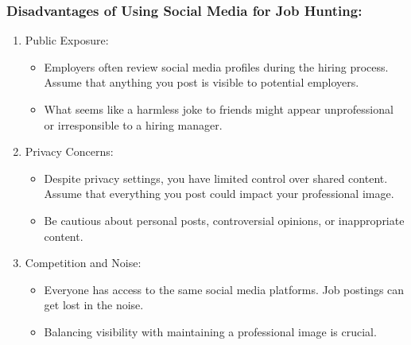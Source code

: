 \subsubsection*{Disadvantages of Using Social Media for Job Hunting:}
\begin{enumerate}[leftmargin=1cm]
\item Public Exposure:
\begin{itemize}[leftmargin=1cm]
   \item Employers often review social media profiles during the hiring process. Assume that anything you post is visible to potential employers.
   \item What seems like a harmless joke to friends might appear unprofessional or irresponsible to a hiring manager.
   \end{itemize}
\item Privacy Concerns:
\begin{itemize}[leftmargin=1cm]
   \item Despite privacy settings, you have limited control over shared content. Assume that everything you post could impact your professional image.
   \item Be cautious about personal posts, controversial opinions, or inappropriate content.
   \end{itemize}
\item Competition and Noise:
\begin{itemize}[leftmargin=1cm]
   \item Everyone has access to the same social media platforms. Job postings can get lost in the noise.
   \item Balancing visibility with maintaining a professional image is crucial.
   \end{itemize}
\end{enumerate}
